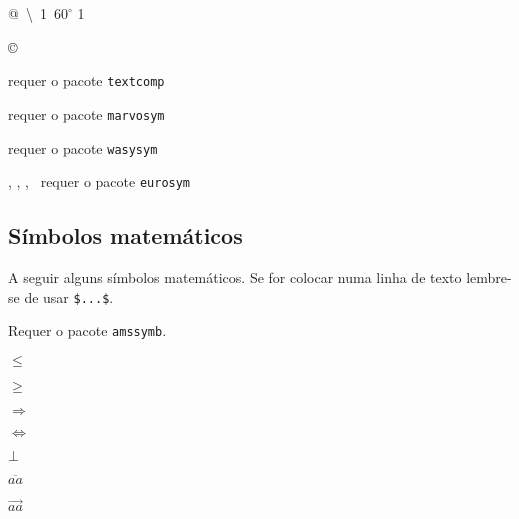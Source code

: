 \documentclass[a4paper]{article}
\begin{document}
@\ \textbackslash\ 1\textordmasculine\ $60^\circ$ 1\textordfeminine

\copyright\ \textregistered\

\textperthousand requer o pacote \verb|textcomp|

\MVAt \Smiley \Heart requer o pacote \verb|marvosym|

\smiley requer o pacote \verb|wasysym|

\officialeuro, \geneuro, \geneuronarrow, \geneurowide\ requer o pacote \verb|eurosym|

\subsection*{Símbolos matemáticos}

A seguir alguns símbolos matemáticos. Se for colocar numa linha de texto lembre-se de usar \verb|$...$|.

Requer o pacote \verb|amssymb|.

$\leqslant$

$\geqslant$

$\Rightarrow$

$\Leftrightarrow$

$\bot$

$\overline{aa}$

$\overrightarrow{aa}$
\end{document}
